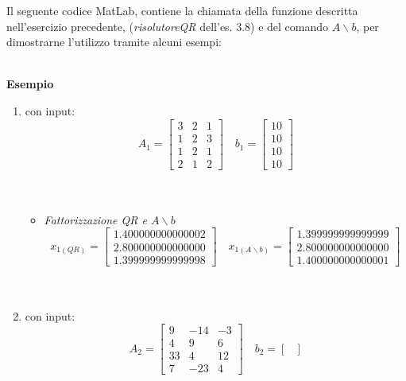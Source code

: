 Il seguente codice MatLab, contiene la chiamata della funzione descritta nell'esercizio precedente, (\textit{risolutoreQR}  dell'es. 3.8) e del comando $A \backslash b$, per dimostrarne l'utilizzo tramite alcuni esempi:\\\
	
\textbf{Esempio}
\begin{enumerate} 
	\item con input:
	      \[
	      A_1 =\begin{bmatrix}
	      	3 & 2 & 1 \\
	      	1 & 2 & 3 \\
	      	1 & 2 & 1 \\
	      	2 & 1 & 2 
	      \end{bmatrix} \quad
	      b_1 =\begin{bmatrix}
	      	10 \\
	      	10 \\
	      	10 \\
	      	10
	      \end{bmatrix}
	      \]\\\
	      \begin{itemize}
	      	\item \textit{Fattorizzazione QR e $A \backslash b$}
	      	      \[
	      	      x_{1(QR)} =\begin{bmatrix}
	      		  	1.400000000000002 \\
	      	    	2.800000000000000 \\
	      	      	1.399999999999998
	      	      \end{bmatrix} \quad
	      	      x_{1(A \backslash b)} =\begin{bmatrix}
	      	      	1.399999999999999 \\
	      	      	2.800000000000000 \\
	      	      	1.400000000000001
	      	      \end{bmatrix}
	      	      \]\\\	
	      \end{itemize}
	\item con input:
	      \[
	      A_2 =\begin{bmatrix}
	      	9  & -14 & -3 \\
	      	4  & 9	 & 6  \\
	      	33 & 4   & 12 \\
	      	7  & -23 & 4 
	      \end{bmatrix} \quad
	      b_2 =\begin{bmatrix}

\end{bmatrix}\]
\end{enumerate}
